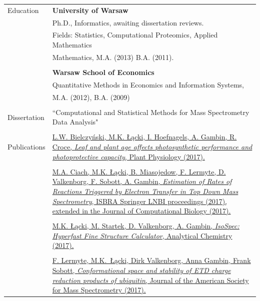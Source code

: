 \documentclass[letterpaper,11pt,oneside]{article}
\begin{document}
\vspace{2em}


\noindent \begin{tabular}{@{} l l}
 \Large{Education}    & \textbf{University of Warsaw} \\
    & Ph.D., Informatics, awaiting dissertation reviews.\\
    & Fields: Statistics, Computational Proteomics, Applied Mathematics\\
    & Mathematics, M.A. (2013) B.A. (2011).\\
    & \\
    & \textbf{Warsaw School of Economics} \\
    & Quantitative Methods in Economics and Information Systems,\\
    & M.A. (2012), B.A. (2009)\\
    & \\
\Large{Dissertation}&``Computational and Statistical Methods for Mass Spectrometry Data Analysis" \\
    & \\
\Large{Publications}
    & \parbox{5.0in}{\href{http://www.plantphysiol.org/content/early/2017/10/10/pp.17.00904}{L.W. Bielczyński, M.K. Łącki, I. Hoefnagels, A. Gambin, R. Croce, \textit{Leaf and plant age affects photosynthetic performance and photoprotective capacity}, Plant Physiology (2017).}}\\
    & \\
    & \parbox{5.0in}{\href{http://online.liebertpub.com/doi/10.1089/cmb.2017.0156}{M.A. Ciach, M.K. Łącki, B. Miasojedow, F. Lermyte, D. Valkenborg, F. Sobott, A. Gambin, \textit{Estimation of Rates of Reactions Triggered by Electron Transfer in Top Down Mass Spectrometry}, ISBRA Springer LNBI proceedings (2017), extended in the Journal of Computational Biology (2017).}}\\
    & \\
    & \parbox{5.0in}{\href{http://pubs.acs.org/doi/abs/10.1021/acs.analchem.6b01459}{M.K. Łącki, M. Startek, D. Valkenborg, A. Gambin, \textit{IsoSpec: Hyperfast Fine Structure Calculator}, Analytical Chemistry (2017).}}\\
    & \\
    & \parbox{5.0in}{\href{https://link.springer.com/article/10.1007/s13361-016-1444-7}{F. Lermyte, M.K. Łącki, Dirk Valkenborg, Anna Gambin, Frank Sobott, \textit{Conformational space and stability of ETD charge reduction products of ubiquitin}, Journal of the American Society for Mass Spectrometry (2017).}}\\

\end{tabular}
\end{document}
